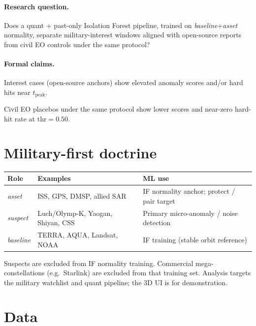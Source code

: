 \documentclass[11pt,a4paper]{article}
\begin{document}
\paragraph{Research question.}
Does a quant + past-only Isolation Forest pipeline, trained on \textit{baseline}+\textit{asset} normality, separate military-interest windows aligned with open-source reports from civil EO controls under the same protocol?

\paragraph{Formal claims.}
\begin{description}[style=nextline,leftmargin=12pt]
  \item[Claim A.] Interest cases (open-source anchors) show elevated anomaly scores and/or hard hits near \(t_{\mathrm{peak}}\).
  \item[Claim B.] Civil EO placebos under the same protocol show lower scores and near-zero hard-hit rate at \(\mathrm{thr}=0.50\).
\end{description}

\section{Military-first doctrine}
\label{sec:doctrine}

\begin{center}
\begin{tabular}{@{}llp{7.2cm}@{}}
\toprule
\textbf{Role} & \textbf{Examples} & \textbf{ML use} \\
\midrule
\textit{asset} & ISS, GPS, DMSP, allied SAR & IF normality anchor; protect / pair target \\
\textit{suspect} & Luch/Olymp-K, Yaogan, Shiyan, CSS & Primary micro-anomaly / noise detection \\
\textit{baseline} & TERRA, AQUA, Landsat, NOAA & IF training (stable orbit reference) \\
\bottomrule
\end{tabular}
\end{center}

Suspects are excluded from IF normality training.
Commercial mega-constellations (e.g.\ Starlink) are excluded from that training set.
Analysis targets the military watchlist and quant pipeline; the 3D UI is for demonstration.

\section{Data}
\label{sec:data}
\end{document}
